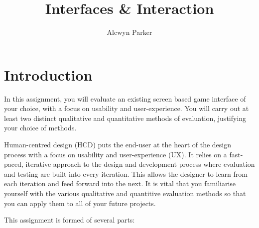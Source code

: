 \documentclass{../fal_assignment}
\title{Interfaces \& Interaction}
\author{Alcwyn Parker}
\begin{document}
\maketitle

\section*{Introduction}

In this assignment, you will evaluate an existing screen based game interface of your choice, with a focus on usability and user-experience. You will carry out at least two distinct qualitative and quantitative methods of evaluation, justifying your choice of methods.

Human-centred design (HCD) puts the end-user at the heart of the design process with a focus on usability and user-experience (UX). It relies on a fast-paced, iterative approach to the design and development process where evaluation and testing are built into every iteration. This allows the designer to learn from each iteration and feed forward into the next. It is vital that you familiarise yourself with the various qualitative and quantitive evaluation methods so that you can apply them to all of your future projects.  

This assignment is formed of several parts:
\end{document}
